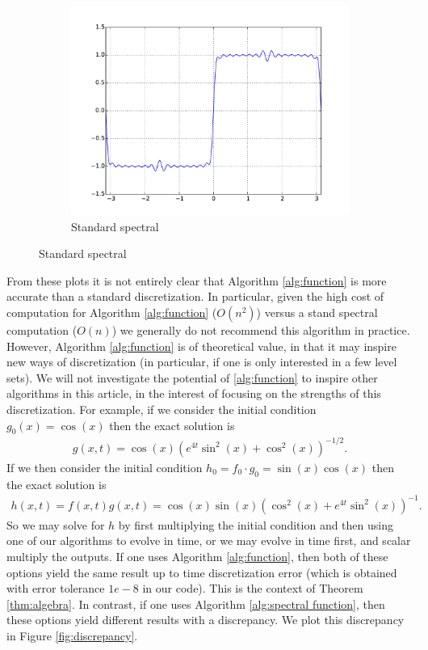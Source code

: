 \documentclass[final,leqno]{siamltex1213}
\begin{document}
\begin{figure}[h]
\begin{subfigure}{0.3\textwidth}
		\includegraphics[width=\textwidth]{./images/function_plots/Koopman_1.pdf}
		\caption{Standard spectral}
		\label{fig:standard function 1}
	\end{subfigure}
\end{figure}

From these plots it is not entirely clear that Algorithm \ref{alg:function} is more accurate than a standard discretization.
In particular, given the high cost of computation for Algorithm \ref{alg:function}  ($O(n^{2})$) versus a stand spectral computation ($O(n)$) we generally do not recommend this algorithm in practice.
However, Algorithm \ref{alg:function} is of theoretical value, in that it may inspire new ways of discretization (in particular, if one is only interested in a few level sets).
We will not investigate the potential of \ref{alg:function} to inspire other algorithms in this article,
in the interest of focusing on the strengths of this discretization.
For example, if we consider the initial condition $g_{0}(x) = \cos(x)$ then the exact solution is
\begin{align*}
	g(x,t) =   \cos(x) \left( e^{4t} \sin^{2}(x) + \cos^{2}(x) \right)^{-1/2}.
\end{align*}
If we then consider the initial condition $h_{0} = f_{0} \cdot g_{0}  = \sin(x) \cos(x)$
then the exact solution is
\begin{align*}
	h(x,t) = f(x,t) g(x,t) = \cos(x) \sin(x) \left( \cos^{2}(x) + e^{4t} \sin^{2}(x) \right)^{-1}.
\end{align*}
So we may solve for $h$ by first multiplying the initial condition and then using one of our algorithms to evolve in time, 
or we may evolve in time first, and scalar multiply the outputs.
If one uses Algorithm \ref{alg:function}, then both of these options yield the same result up to time discretization error (which is obtained with error tolerance $1e-8$ in our code).
This is the context of Theorem \ref{thm:algebra}.
In contrast, if one uses Algorithm \ref{alg:spectral function}, then these options yield different results with a discrepancy.
We plot this discrepancy in Figure \ref{fig:discrepancy}.
\end{document}
